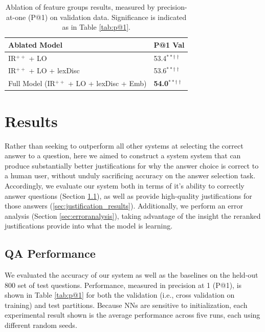 \begin{table}[t!]
\begin{center}
\begin{footnotesize}
\begin{tabular}{ll}
\hline
 Ablated Model & P@1 Val \\ 
\hline
	IR$^{++}$ + LO 					&		53.4$^{**\dagger\dagger}$\\
	IR$^{++}$ + LO + lexDisc 	&		53.6$^{**\dagger\dagger}$ \\
    Full Model (IR$^{++}$ + LO + lexDisc + Emb)  &	{\bf 54.0}$^{**\dagger\dagger}$	\\
\end{tabular}
\end{footnotesize}
\vspace{-1mm}
\caption{{\footnotesize Ablation of feature groups results, measured by precision-at-one (P@1) on validation data.  Significance is indicated as in Table \ref{tab:p@1}.}} 
\label{tab:ablation}
\vspace{-5mm}
\end{center}
\end{table}

\section{Results}
\label{sec:results}

Rather than seeking to outperform all other systems at selecting the correct answer to a question, here we aimed to construct a system system that can produce substantially better justifications for why the answer choice is correct to a human user, without unduly sacrificing accuracy on the answer selection task.  Accordingly, we evaluate our system both in terms of it's ability to correctly answer questions (Section \ref{sec:accuracy}), as well as provide high-quality justifications for those answers (\ref{sec:justification_results}).  Additionally, we perform an error analysis (Section \ref{sec:erroranalysis}), taking advantage of the insight the reranked justifications provide into what the model is learning.

\subsection{QA Performance}
\label{sec:accuracy}
We evaluated the accuracy of our system as well as the baselines on the held-out 800 set of test questions.  Performance, measured in precision at 1 (P@1)\cite{manning08}, is shown in Table \ref{tab:p@1} for both the validation (i.e., cross validation on training) and test partitions.  Because NNs are sensitive to initialization, each experimental result shown is the average performance across five runs, each using different random seeds.   

